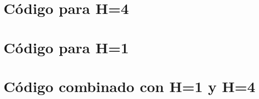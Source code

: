 \documentclass[a4paper,onecolumn]{extarticle}
\let\stdsection\section
\renewcommand\section{\newpage\stdsection}
\begin{document}
\begin{sloppypar}
\section{Código para H=4}\label{Anexo:H1}


\section{Código para H=1}\label{Anexo:H4}


\section{Código combinado con H=1 y H=4}\label{Anexo:Comb}

\end{sloppypar}
\end{document}
